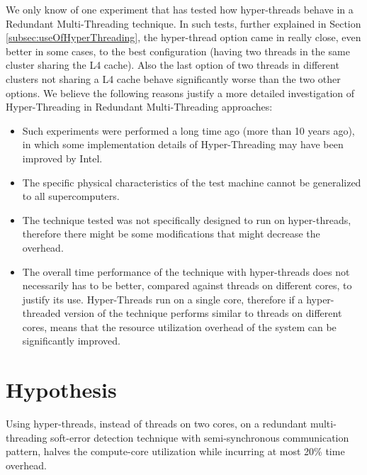 We only know of one experiment that has tested how hyper-threads behave in a Redundant Multi-Threading technique\cite{wang2007compiler}. In such tests, further explained in Section \ref{subsec:useOfHyperThreading}, the hyper-thread option came in really close, even better in some cases, to the best configuration (having two threads in the same cluster sharing the L4 cache). Also the last option of two threads in different clusters not sharing a L4 cache behave significantly worse than the two other options. We believe the following reasons justify a more detailed investigation of Hyper-Threading in Redundant Multi-Threading approaches:

\begin{itemize}
\item Such experiments were performed a long time ago (more than 10 years ago), in which some implementation details of Hyper-Threading may have been improved by Intel.
\item The specific physical characteristics of the test machine cannot be generalized to all supercomputers.
\item The technique tested was not specifically designed to run on hyper-threads, therefore there might be some modifications that might decrease the overhead.
\item The overall time performance of the technique with hyper-threads does not necessarily has to be better, compared against threads on different cores, to justify its use. Hyper-Threads run on a single core, therefore if a hyper-threaded version of the technique performs similar to threads on different cores, means that the resource utilization overhead of the system can be significantly improved. 
\end{itemize}

\section{Hypothesis}
\label{sec:Hypothesis}

Using hyper-threads, instead of threads on two cores, on a redundant multi-threading soft-error detection technique with semi-synchronous communication pattern, halves the compute-core utilization while incurring at most 20\% time overhead. 

